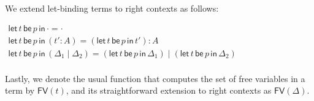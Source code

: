 \documentclass{elsarticle}
\newcommand{\FILLnt}[1]{\mathit{#1}}
\newcommand{\FILLsym}[1]{#1}
\begin{document}
\begin{definition}
  \label{def:delta-let}
  We extend let-binding terms to right contexts as follows:
  \begin{center}
    \begin{math}
      \begin{array}{lll}
         \mathsf{let}\, \FILLnt{t} \,\mathsf{be}\, \FILLnt{p} \,\mathsf{in}\,  \cdot   =  \cdot \\
         \mathsf{let}\, \FILLnt{t} \,\mathsf{be}\, \FILLnt{p} \,\mathsf{in}\, \FILLsym{(}  \FILLnt{t'}  \FILLsym{:}  \FILLnt{A}  \FILLsym{)}  =  (  \mathsf{let}\, \FILLnt{t} \,\mathsf{be}\, \FILLnt{p} \,\mathsf{in}\, \FILLnt{t'}  )   \FILLsym{:}  \FILLnt{A}\\
         \mathsf{let}\, \FILLnt{t} \,\mathsf{be}\, \FILLnt{p} \,\mathsf{in}\, \FILLsym{(}   \Delta_{{\mathrm{1}}}  \mid  \Delta_{{\mathrm{2}}}   \FILLsym{)}  =  \FILLsym{(}   \mathsf{let}\, \FILLnt{t} \,\mathsf{be}\, \FILLnt{p} \,\mathsf{in}\, \Delta_{{\mathrm{1}}}   \FILLsym{)}  \mid  \FILLsym{(}   \mathsf{let}\, \FILLnt{t} \,\mathsf{be}\, \FILLnt{p} \,\mathsf{in}\, \Delta_{{\mathrm{2}}}   \FILLsym{)} \\
      \end{array}
    \end{math}
  \end{center}
\end{definition}
\noindent
Lastly, we denote the usual function that computes the set of free
variables in a term by $\mathsf{FV}(\FILLnt{t})$, and its straightforward
extension to right contexts as $\mathsf{FV}(\Delta)$.
\end{document}
